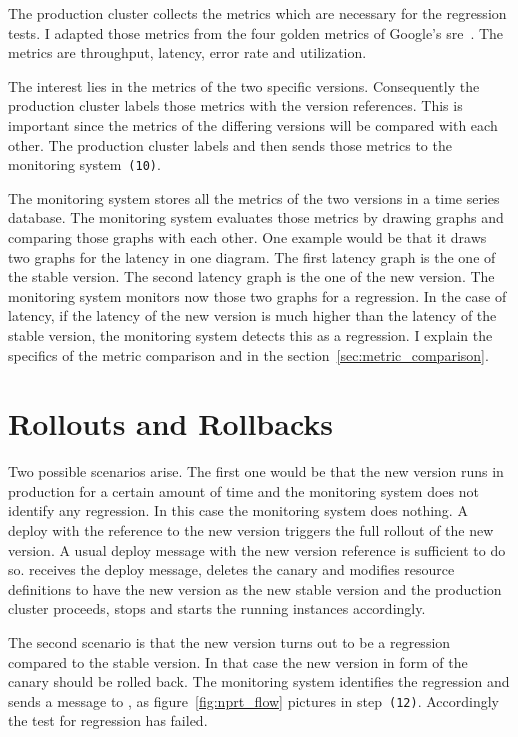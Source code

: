 The production cluster collects the metrics which are necessary for the regression tests.
I adapted those metrics from the four golden metrics of Google's
\gls{sre}~\cite{sre_monitoring}. The metrics are throughput, latency, error rate and
utilization.

The interest lies in the metrics of the two specific versions. Consequently the production
cluster labels those metrics with the version references. This is important since the
metrics of the differing versions will be compared with each other. The production cluster
labels and then sends those metrics to the monitoring system~\texttt{(10)}.

The monitoring system stores all the metrics of the two versions in a time series
database. The monitoring system evaluates those metrics by drawing graphs and comparing
those graphs with each other. One example would be that it draws two graphs for the
latency in one diagram. The first latency graph is the one of the stable version. The
second latency graph is the one of the new version. The monitoring system monitors now
those two graphs for a regression. In the case of latency, if the latency of the new
version is much higher than the latency of the stable version, the monitoring system
detects this as a regression. I explain the specifics of the metric comparison and in the
section~\ref{sec:metric_comparison}.

\section{Rollouts and Rollbacks}

Two possible scenarios arise. The first one would be that the new version runs in
production for a certain amount of time and the monitoring system does not identify any
regression. In this case the monitoring system does nothing. A deploy with the reference
to the new version triggers the full rollout of the new version. A usual deploy message
with the new version reference is sufficient to do so. \deployer{} receives the deploy
message, deletes the canary and modifies resource definitions to have the new version as
the new stable version and the production cluster proceeds, stops and starts the running
instances accordingly.

The second scenario is that the new version turns out to be a regression compared to the
stable version. In that case the new version in form of the canary should be rolled
back. The monitoring system identifies the regression and sends a message to \deployer{}, as
figure~\ref{fig:nprt_flow} pictures in step~\texttt{(12)}. Accordingly the test for
regression has failed.

